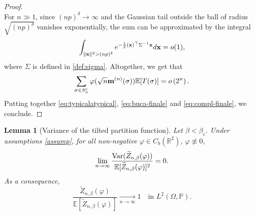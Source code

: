\documentclass[11pt,oneside]{amsart}
\numberwithin{equation}{section}  %
\theoremstyle{plain}
\newtheorem{lemma}[theorem]{Lemma}
\theoremstyle{remark}
\def \R {{\mathbb R}}
\def \E {{\mathbb E}}
\def \bm {{\bf m}}
\begin{document}
\begin{proof}
$$$$
For $n\gg 1$, since $(np)^{\delta} \to \infty$ and the Gaussian tail outside the ball of radius $\sqrt{(np)^{\delta}}$ vanishes exponentially, the sum can be approximated by the integral
$$ \int_{\|{\bf x}\|^2> (np)^{\delta}}
 e^{-\frac{1}{2} ({\bf x})^\top \Sigma^{-1} {\bf x}}d{\bf x} =o(1),$$
where $\Sigma$ is defined in \eqref{def:sigma}. Altogether, we get that
\begin{equation}\label{eq:compl-finale}
\sum_{\sigma \in S_n^c} \varphi(\sqrt{n} \bm^{(n)}(\sigma)) \E[T(\sigma)] =o\left(2^n\right).
\end{equation}
Putting together \eqref{eq:typicalatypical}, \eqref{eq:buca-finale} and \eqref{eq:compl-finale}, we conclude.
\end{proof}



\begin{lemma}[Variance of the tilted partition function]
\label{prop:vartilted}
Let $\beta < \beta_c$. Under assumptions \eqref{assump}, for all non-negative $\varphi \in C_b(\R^2)$, $\varphi \not\equiv 0$, 
$$ \lim_{n \to \infty} \frac{{\rm Var}(\widetilde{Z}_{n,\beta}(\varphi))}{\E[\widetilde{Z}_{n,\beta}(\varphi)]^2} = 0. $$
As a consequence,
$$\frac{\widetilde{Z}_{n,\beta}(\varphi)}{\mathbb{E}[\widetilde{Z}_{n,\beta}(\varphi)]} \underset{n\to\infty}{\longrightarrow} 1 \quad \text{in } L^2(\Omega, \mathbb{P}).
$$
\end{lemma}
\end{document}
